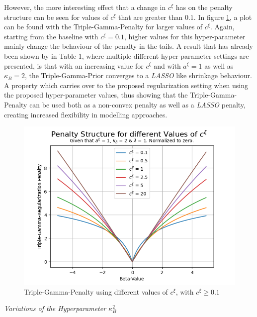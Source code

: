 \documentclass[12pt,a4paper]{article}
\begin{document}
However, the more interesting effect that a change in $c^\xi$ has on the penalty structure can be seen for values of $c^\xi$ that are greater than $0.1$. In figure \ref{fig:ChangeInC_LargeValues}, a plot can be found with the Triple-Gamma-Penalty for larger values of $c^\xi$. Again, starting from the baseline with $c^\xi = 0.1$, higher values for this hyper-parameter mainly change the behaviour of the penalty in the tails. A result that has already been shown by \textcite{TGP2020} in Table 1, where multiple different hyper-parameter settings are presented, is that with an increasing value for $c^\xi$ and with $a^\xi = 1$ as well as $\kappa_B = 2$, the Triple-Gamma-Prior converges to a \textit{LASSO} like shrinkage behaviour. A property which carries over to the proposed regularization setting when using the proposed hyper-parameter values, thus showing that the Triple-Gamma-Penalty can be used both as a non-convex penalty as well as a \textit{LASSO} penalty, creating increased flexibility in modelling approaches. 

\begin{figure}[!h]
\centering
\includegraphics[scale=0.75]{../02_simulation/021_simulation_figures/TGPenalty_ChangeInC_Part1.png}
\caption{Triple-Gamma-Penalty using different values of $c^\xi$, with $c^\xi \geq 0.1$}
\label{fig:ChangeInC_LargeValues}
\end{figure}

\textit{Variations of the Hyperparameter $\kappa_B^2$}\\
\end{document}

